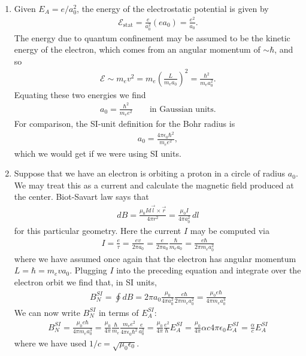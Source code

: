 \documentclass{article}
\theoremstyle{definition}
\newcommand{\al}{\alpha}
\newcommand{\f}[2]{\frac{#1}{#2}}
\newcommand{\lp}{\left(}
\newcommand{\rp}{\right)}
\begin{document}
\begin{enumerate}[label=\alph*)]
	\item Given $E_A = e/a_0^2$, the energy of the electrostatic potential is given by 
	\begin{align*}
	\mathcal{E}_\text{stat} = \f{e}{a_0^2}  (e a_0) = \f{e^2}{a_0}.
	\end{align*}
	The energy due to quantum confinement may be assumed to be the kinetic energy of the electron, which comes from an angular momentum of $\sim \hbar$, and so 
	\begin{align*}
	\mathcal{E} \sim m_ev^2 = m_e \lp \f{L}{m_ea_0}\rp^2 = \f{\hbar^2}{m_e a_0^2}.
	\end{align*}
	Equating these two energies we find 
	\begin{align*}
	a_0 = \f{\hbar^2}{m_e e^2} \quad\quad \text{in Gaussian units.}
	\end{align*}
	For comparison, the SI-unit definition for the Bohr radius is 
	\begin{align*}
	a_0 = \f{4\pi \epsilon_0\hbar^2}{ m_e  e^2},
	\end{align*} 
	which we would get if we were using SI units. 
	
	\item Suppose that we have an electron is orbiting a proton in a circle of radius $a_0$. We may treat this as a current and calculate the magnetic field produced at the center. Biot-Savart law says that
	\begin{align*}
	dB = \f{\mu_0 I d\vec{l}\times \vec{r}}{4\pi r^2} = \f{\mu_0 I }{4\pi a_0^2}\,dl
	\end{align*}
	for this particular geometry. Here the current $I$ may be computed via
	\begin{align*}
	I = \f{e}{\tau} = \f{e v}{2\pi a_0} = \f{e}{2\pi a_0} \f{\hbar}{m_ea_0} = \f{e \hbar }{2\pi m_ea_0^2}
	\end{align*}
	where we have assumed once again that the electron has angular momentum $L = \hbar =  m_eva_0$. Plugging $I$ into the preceding equation and integrate over the electron orbit we find that, in SI units,
	\begin{align*}
	B_N^{SI} = \oint dB = 2\pi a_0 \f{\mu_0 }{4\pi a_0^2}\f{e \hbar }{2\pi m_e a_0^2} = {\f{\mu_0 e \hbar}{4\pi m_e a_0^3}}
	\end{align*}
	We can now write $B_N^{SI}$ in terms of $E_A^{SI}$:
	\begin{align*}
	B_N^{SI} = \f{\mu_0 e \hbar}{4\pi m_e a_0^3} = \f{\mu_0}{4\pi} \f{\hbar}{m_e} \f{m_e e^2}{4\pi \epsilon_0 \hbar^2}  \f{e}{ a_0^2}  = \f{\mu_0}{4\pi} \f{e^2}{\hbar} E_A^{SI} = \f{\mu_0}{4\pi} \al c 4\pi \epsilon_0 E_A^{SI} = \boxed{\f{\al}{c}E_A^{SI}}
	\end{align*}
	where we have used $1/c = \sqrt{\mu_0 \epsilon_0}$.
	

\end{enumerate}
\end{document}
